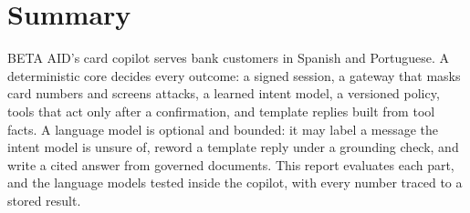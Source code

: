 \chapter*{Summary}

BETA AID's card copilot serves bank customers in Spanish and Portuguese. A deterministic core decides every
outcome: a signed session, a gateway that masks card numbers and screens attacks, a learned intent model, a
versioned policy, tools that act only after a confirmation, and template replies built from tool facts. A language
model is optional and bounded: it may label a message the intent model is unsure of, reword a template reply under a
grounding check, and write a cited answer from governed documents. This report evaluates each part, and the
language models tested inside the copilot, with every number traced to a stored result.

